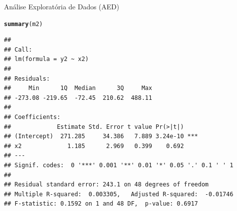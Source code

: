 \documentclass{beamer}\usepackage[]{graphicx}\usepackage[]{color}
\makeatletter
\newcommand{\hlstd}[1]{\textcolor[rgb]{0.345,0.345,0.345}{#1}}%
\newcommand{\hlkwd}[1]{\textcolor[rgb]{0.737,0.353,0.396}{\textbf{#1}}}%
\newenvironment{kframe}{%
 \def\at@end@of@kframe{}%
 \ifinner\ifhmode%
  \def\at@end@of@kframe{\end{minipage}}%
  \begin{minipage}{\columnwidth}%
 \fi\fi%
 \def\FrameCommand##1{\hskip\@totalleftmargin \hskip-\fboxsep
 \colorbox{shadecolor}{##1}\hskip-\fboxsep
     \hskip-\linewidth \hskip-\@totalleftmargin \hskip\columnwidth}%
 \MakeFramed {\advance\hsize-\width
   \@totalleftmargin\z@ \linewidth\hsize
   \@setminipage}}%
 {\par\unskip\endMakeFramed%
 \at@end@of@kframe}
\newenvironment{knitrout}{}{} %
\renewenvironment{knitrout}{\setlength{\topsep}{0mm}}{}
\makeatother
\begin{document}
\begin{frame}[fragile]{Análise Exploratória de Dados (AED)}

\begin{knitrout}\tiny
{}\color{fgcolor}\begin{kframe}
\begin{alltt}
\hlkwd{summary}\hlstd{(m2)}
\end{alltt}
\begin{verbatim}
## 
## Call:
## lm(formula = y2 ~ x2)
## 
## Residuals:
##     Min      1Q  Median      3Q     Max 
## -273.08 -219.65  -72.45  210.62  488.11 
## 
## Coefficients:
##             Estimate Std. Error t value Pr(>|t|)    
## (Intercept)  271.285     34.386   7.889 3.24e-10 ***
## x2             1.185      2.969   0.399    0.692    
## ---
## Signif. codes:  0 '***' 0.001 '**' 0.01 '*' 0.05 '.' 0.1 ' ' 1
## 
## Residual standard error: 243.1 on 48 degrees of freedom
## Multiple R-squared:  0.003305,	Adjusted R-squared:  -0.01746 
## F-statistic: 0.1592 on 1 and 48 DF,  p-value: 0.6917
\end{verbatim}
\end{kframe}
\end{knitrout}


\end{frame} 
\end{document}
